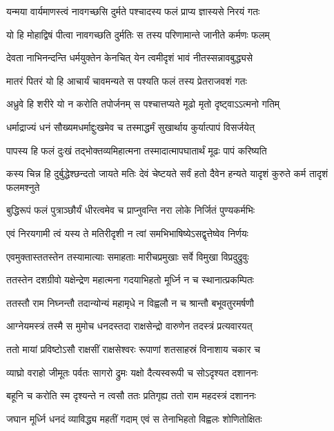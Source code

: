 \twolineshloka
{यन्मया वार्यमाणस्त्वं नावगच्छसि दुर्मते}
{पश्चादस्य फलं प्राप्य ज्ञास्यसे निरयं गतः} %

\twolineshloka
{यो हि मोहाद्विषं पीत्वा नावगच्छति दुर्मतिः}
{स तस्य परिणामान्ते जानीते कर्मणः फलम्} %

\twolineshloka
{देवता नाभिनन्दन्ति धर्मयुक्तेन केनचित्}
{येन त्वमीदृशं भावं नीतस्सन्नावबुद्ध्यसे} %

\twolineshloka
{मातरं पितरं यो हि आचार्यं चावमन्यते}
{स पश्यति फलं तस्य प्रेतराजवशं गतः} %

\twolineshloka
{अध्रुवे हि शरीरे यो न करोति तपोर्जनम्}
{स पश्चात्तप्यते मूढो मृतो दृष्ट्वाऽऽत्मनो गतिम्} %

\twolineshloka
{धर्माद्राज्यं धनं सौख्यमधर्माद्दुःखमेव च}
{तस्माद्धर्मं सुखार्थाय कुर्यात्पापं विसर्जयेत्} %

\twolineshloka
{पापस्य हि फलं दुःखं तद्भोक्तव्यमिहात्मना}
{तस्मादात्मापघातार्थं मूढः पापं करिष्यति} %

\threelineshloka
{कस्य चिन्न हि दुर्बुद्धेश्छन्दतो जायते मतिः}
{देवं चेष्टयते सर्वं हतो दैवेन हन्यते}
{यादृशं कुरुते कर्म तादृशं फलमश्नुते} %

\twolineshloka
{बुद्धिरूपं फलं पुत्राञ्छौर्यं धीरत्वमेव च}
{प्राप्नुवन्ति नरा लोके निर्जितं पुण्यकर्मभिः} %

\twolineshloka
{एवं निरयगामी त्वं यस्य ते मतिरीदृशी}
{न त्वां समभिभाषिष्येऽसद्वृत्तेष्वेव निर्णयः} %

\twolineshloka
{एवमुक्तास्ततस्तेन तस्यामात्याः समाहताः}
{मारीचप्रमुखाः सर्वे विमुखा विप्रदुद्रुवुः} %

\twolineshloka
{ततस्तेन दशग्रीवो यक्षेन्द्रेण महात्मना}
{गदयाभिहतो मूर्ध्नि न च स्थानात्प्रकम्पितः} %

\twolineshloka
{ततस्तौ राम निघ्नन्तौ तदान्योन्यं महामृधे}
{न विह्वलौ न च श्रान्तौ बभूवतुरमर्षणौ} %

\twolineshloka
{आग्नेयमस्त्रं तस्मै स मुमोच धनदस्तदा}
{राक्षसेन्द्रो वारुणेन तदस्त्रं प्रत्यवारयत्} %

\twolineshloka
{ततो मायां प्रविष्टोऽसौ राक्षसीं राक्षसेश्वरः}
{रूपाणां शतसाहस्रं विनाशाय चकार च} %

\twolineshloka
{व्याघ्रो वराहो जीमूतः पर्वतः सागरो द्रुमः}
{यक्षो दैत्यस्वरूपी च सोऽदृश्यत दशाननः} %

\twolineshloka
{बहूनि च करोति स्म दृश्यन्ते न त्वसौ ततः}
{प्रतिगृह्य ततो राम महदस्त्रं दशाननः} %

\twolineshloka
{जघान मूर्ध्नि धनदं व्याविद्ध्य महतीं गदाम्}
{एवं स तेनाभिहतो विह्वलः शोणितोक्षितः} %

